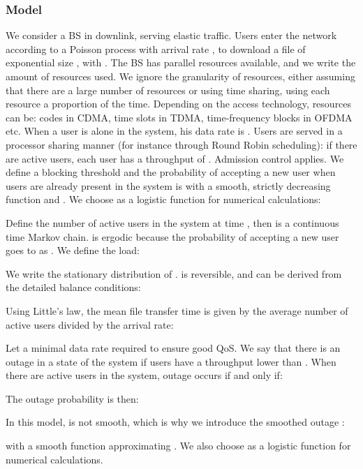 \documentclass[10pt,conference,letterpaper]{IEEEtran}
\begin{document}
\subsubsection{Model}
	We consider a \ac{BS} in downlink, serving elastic traffic. Users enter the network according to a Poisson process with arrival rate , to download a file of exponential size , with . The \ac{BS} has  parallel resources available, and we write  the amount of resources used. We ignore the granularity of resources, either assuming that there are a large number of resources or using time sharing, using each resource a proportion  of the time. Depending on the access technology, resources can be: codes in \ac{CDMA}, time slots in \ac{TDMA}, time-frequency blocks in \ac{OFDMA} etc. When a user is alone in the system, his data rate is . Users are served in a processor sharing manner (for instance through Round Robin scheduling): if there are  active users, each user has a throughput of . Admission control applies. We define  a blocking threshold and the probability of accepting a new user when  users are already present in the system is  with  a smooth, strictly decreasing function and . We choose  as a logistic function for numerical calculations:

	
	Define  the number of active users in the system at time , then  is a continuous time Markov chain.  is ergodic because the probability of accepting a new user goes to  as . We define the load:

We write  the stationary distribution of .  is reversible, and  can be derived from the detailed balance conditions:

Using Little's law, the mean file transfer time is given by the average number of active users divided by the arrival rate:

Let  a minimal data rate required to ensure good \ac{QoS}. We say that there is an outage in a state of the system if users have a throughput lower than . When there are  active users in the system, outage occurs if and only if:

The outage probability is then:

In this model,  is not smooth, which is why we introduce the smoothed outage : 

with  a smooth function approximating  . We also choose  as a logistic function for numerical calculations.
\end{document}
